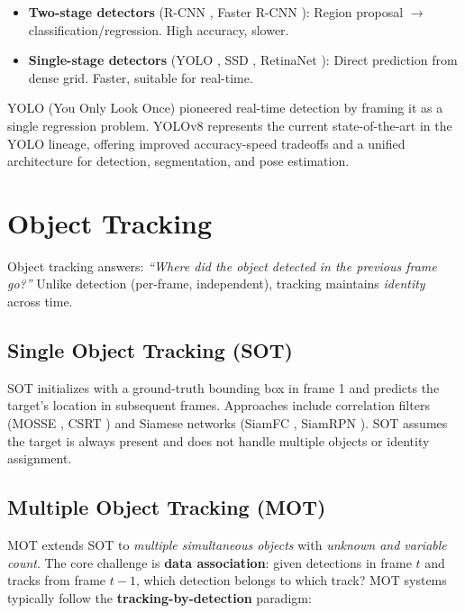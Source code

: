 \begin{itemize}
    \item \textbf{Two-stage detectors} (R-CNN \cite{girshick2014rcnn}, Faster R-CNN \cite{ren2015faster}): Region proposal $\to$ classification/regression. High accuracy, slower.
    \item \textbf{Single-stage detectors} (YOLO \cite{redmon2016yolo}, SSD \cite{liu2016ssd}, RetinaNet \cite{lin2017retinanet}): Direct prediction from dense grid. Faster, suitable for real-time.
\end{itemize}

YOLO (You Only Look Once) pioneered real-time detection by framing it as a single regression problem. YOLOv8 \cite{jocher2023ultralytics} represents the current state-of-the-art in the YOLO lineage, offering improved accuracy-speed tradeoffs and a unified architecture for detection, segmentation, and pose estimation.

\section{Object Tracking}
\label{sec:object-tracking}

Object tracking answers: \textit{``Where did the object detected in the previous frame go?''} Unlike detection (per-frame, independent), tracking maintains \textit{identity} across time.

\subsection{Single Object Tracking (SOT)}
\label{sec:sot}
SOT initializes with a ground-truth bounding box in frame 1 and predicts the target's location in subsequent frames. Approaches include correlation filters (MOSSE \cite{bolme2010mosse}, CSRT \cite{lukezic2017csrt}) and Siamese networks (SiamFC \cite{bertinetto2016siamfc}, SiamRPN \cite{li2018siamrpn}). SOT assumes the target is always present and does not handle multiple objects or identity assignment.

\subsection{Multiple Object Tracking (MOT)}
\label{sec:mot}
MOT extends SOT to \textit{multiple simultaneous objects} with \textit{unknown and variable count}. The core challenge is \textbf{data association}: given detections in frame $t$ and tracks from frame $t-1$, which detection belongs to which track? MOT systems typically follow the \textbf{tracking-by-detection} paradigm:

